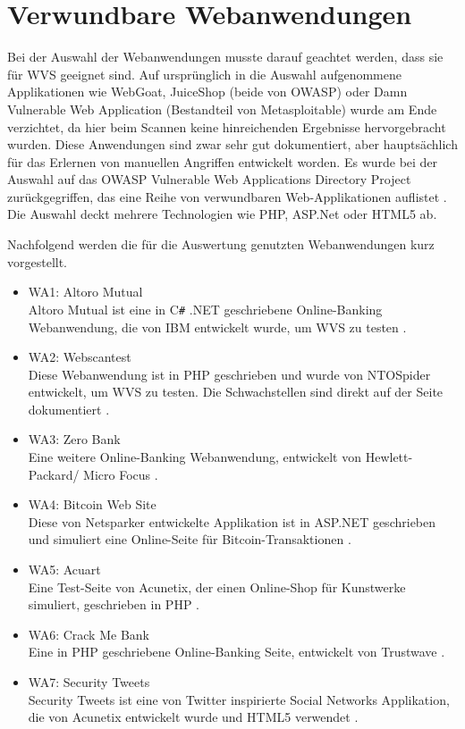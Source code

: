 \documentclass[12pt,oneside,a4paper,parskip,pointlessnumbers]{scrbook}
\begin{document}
\newpage
\section{Verwundbare Webanwendungen}
  Bei der Auswahl der Webanwendungen musste darauf geachtet werden, dass sie für WVS geeignet sind. Auf ursprünglich in die Auswahl aufgenommene Applikationen wie WebGoat, JuiceShop (beide von OWASP) oder Damn Vulnerable Web Application (Bestandteil von Metasploitable) wurde am Ende verzichtet, da hier beim Scannen keine hinreichenden Ergebnisse hervorgebracht wurden. Diese Anwendungen  sind zwar sehr gut dokumentiert, aber hauptsächlich für das Erlernen von manuellen Angriffen entwickelt worden. Es wurde bei der Auswahl auf das OWASP Vulnerable Web Applications Directory Project zurückgegriffen, das eine Reihe von verwundbaren Web-Applikationen auflistet \cite{OWASPWebApps}. Die Auswahl deckt mehrere Technologien wie PHP, ASP.Net oder HTML5 ab.

  Nachfolgend werden die für die Auswertung genutzten Webanwendungen kurz vorgestellt.
  \begin{itemize}
    \item WA1: Altoro Mutual\\
    Altoro Mutual ist eine in C\texttt{\#} .NET geschriebene Online-Banking Webanwendung, die von IBM entwickelt wurde, um WVS zu testen \cite{Altoro}.
    \item WA2: Webscantest\\
    Diese Webanwendung ist in PHP geschrieben und wurde von NTOSpider entwickelt, um WVS zu testen. Die Schwachstellen sind direkt auf der Seite dokumentiert \cite{Webscantest}.
    \item WA3: Zero Bank\\
    Eine weitere Online-Banking Webanwendung, entwickelt von Hewlett-Packard/ Micro Focus \cite{Zero}.
    \item WA4: Bitcoin Web Site\\
    Diese von Netsparker entwickelte Applikation ist in ASP.NET geschrieben und simuliert eine Online-Seite für Bitcoin-Transaktionen \cite{Aspnet}.
    \item WA5: Acuart\\
    Eine Test-Seite von Acunetix, der einen Online-Shop für Kunstwerke simuliert, geschrieben in PHP \cite{Acuart}.
    \item WA6: Crack Me Bank\\
    Eine in PHP geschriebene Online-Banking Seite, entwickelt von Trustwave \cite{CrackMeBank}.
    \item WA7: Security Tweets\\
    Security Tweets ist eine von Twitter inspirierte Social Networks Applikation, die von Acunetix entwickelt wurde und HTML5 verwendet \cite{Tweets}.
 \end{itemize}
\end{document}
